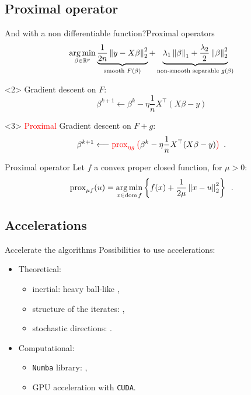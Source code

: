 \documentclass[10pt,aspectratio=43]{beamer}
\begin{document}
\subsection{Proximal operator}
\begin{frame}{And with a non differentiable function?}{Proximal operators}
\[\argmin_{\beta\in \bbR^p}
\LaTeXunderbrace{\frac{1}{2n}\norm{y-X\beta}_2^2}_{\text{smooth } F(\beta)} +
\LaTeXunderbrace{
    \lambda_1 \norm{\beta}_1 + \frac{\lambda_2}{2}\norm{\beta}_2^2}_{
\text{non-smooth separable } g(\beta)
}\]
\begin{onlyenv}<2>
Gradient descent on $F$:
\[\beta^{k+1} \longleftarrow \beta^k - \eta \frac{1}{n}X^\top(X\beta - y)\]
\end{onlyenv}

\begin{onlyenv}<3>
\textcolor{red}{Proximal} Gradient descent on $F+g$:
\[\beta^{k+1} \longleftarrow
\textcolor{red}{\operatorname{prox}_{\eta g}\big( }\beta^k -
 \eta \frac{1}{n}X^\top(X\beta - y)\textcolor{red}{\big)}\enspace.\]

\begin{block}{Proximal operator}
Let $f$ a convex proper closed function, for $\mu>0$:
\begin{align*}
\operatorname{prox}_{\mu f}(u) = \mathop{\mathrm{arg\,min}}_{x\in\operatorname{dom} f}\left\{
    f(x) + \frac{1}{2\mu}\left \lVert x-u \right \rVert_2^2
\right\} \enspace.
\end{align*}
\end{block}
\end{onlyenv}

\end{frame}


\subsection{Accelerations}
\begin{frame}{Accelerate the algorithms}
Possibilities to use accelerations:
\begin{itemize}
    \setlength\itemsep{1em}
    \item Theoretical:
    \begin{itemize}
        \item inertial: heavy ball-like \citep{nesterov27method},
        \item structure of the iterates: \citep{bertrand2021anderson},
        \item stochastic directions: \citep{nesterov2012efficiency}.
    \end{itemize}
    \item Computational:
    \begin{itemize}
        \item \texttt{Numba} library: \citep{lam2015numba},
        \item GPU acceleration with \texttt{CUDA}.
    \end{itemize}
\end{itemize}
\end{frame}
\end{document}
